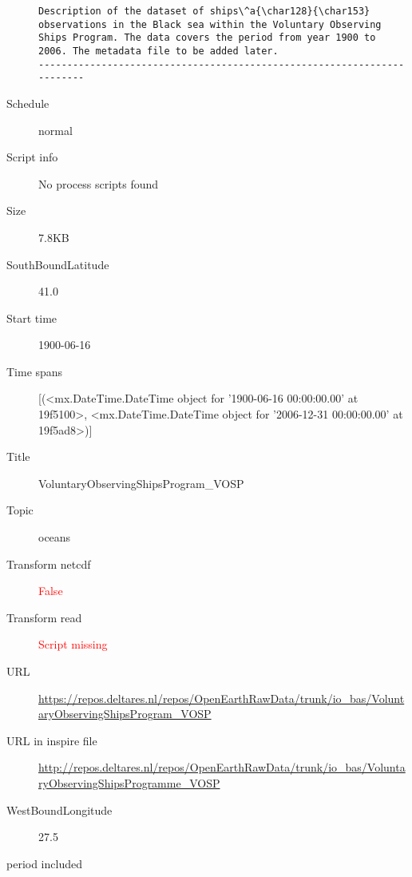 \documentclass[9]{report}
\begin{document}
\begin{description}
\begin{verbatim}
Description of the dataset of ships\^a{\char128}{\char153} observations in the Black sea within the Voluntary Observing Ships Program. The data covers the period from year 1900 to 2006. The metadata file to be added later.
------------------------------------------------------------------------

\end{verbatim}
  \item[Schedule] normal
  \item[Script info] No process scripts found
  \item[Size] 7.8KB
  \item[SouthBoundLatitude] 41.0
  \item[Start time] 1900-06-16
  \item[Time spans] [(<mx.DateTime.DateTime object for '1900-06-16 00:00:00.00' at 19f5100>, <mx.DateTime.DateTime object for '2006-12-31 00:00:00.00' at 19f5ad8>)]
  \item[Title]  VoluntaryObservingShipsProgram\_VOSP 
  \item[Topic] oceans
  \item[Transform netcdf] \textcolor{red}{False}
  \item[Transform read] \textcolor{red}{Script missing}
  \item[URL] \href{https://repos.deltares.nl/repos/OpenEarthRawData/trunk/io\_bas/VoluntaryObservingShipsProgram\_VOSP}{https://repos.deltares.nl/repos/OpenEarthRawData/trunk/io\_bas/VoluntaryObservingShipsProgram\_VOSP}
  \item[URL in inspire file] \href{http://repos.deltares.nl/repos/OpenEarthRawData/trunk/io\_bas/VoluntaryObservingShipsProgramme\_VOSP}{http://repos.deltares.nl/repos/OpenEarthRawData/trunk/io\_bas/VoluntaryObservingShipsProgramme\_VOSP}
  \item[WestBoundLongitude] 27.5
  \item[period included] 
\end{description}
\end{document}

